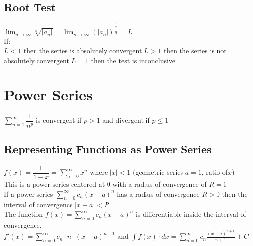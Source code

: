 \documentclass{article}
\begin{document}
\subsection*{Root Test}
$\displaystyle \lim_{n\to\infty}\sqrt[n]{|a_n|}=\lim_{n\to\infty}(|a_n|)^{\dfrac{1}{n}}=L$\\
If:\\
\indent $L<1$ then the series is absolutely convergent
\indent $L>1$ then the series is not absolutely convergent
\indent $L=1$ then the test is inconclusive
\section{Power Series}
$\displaystyle \sum^\infty_{n=1}\dfrac{1}{n^p}$ is convergent if $p>1$ and divergent if $p\le 1$
\subsection*{Representing Functions as Power Series}
$\displaystyle f(x)=\dfrac{1}{1-x}=\sum^\infty_{n=0}x^n$ where $|x|<1$ (geometric series $a=1$, ratio of$x$)\\
This is a power series centered at 0 with a radius of convergence of $R=1$\\
If a power series $\displaystyle \sum^\infty_{n=0}c_n(x-a)^n$ has a radius of convergence $R>0$ then the interval of convergence $\left| x-a \right|<R$\\
The function $f(x)=\displaystyle \sum^\infty_{n=0}c_n(x-a)^n$ is differentiable inside the interval of convergence.\\
$f'(x)=\displaystyle \sum^\infty_{n=0}c_n \cdot n \cdot (x-a)^{n-1}$ and $\int f(x)\cdot dx = \displaystyle \sum^\infty_{n=0}c_n\frac{(x-a)^{n+1}}{n+1}+C$
\end{document}
